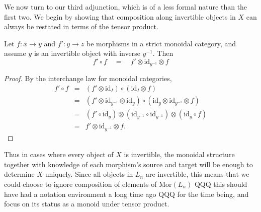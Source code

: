 \documentclass{amsbook} %
\newcommand{\mb}{\mathbf}
\newcommand{\mon}{\ensuremath{\mb{Mon}}}
\numberwithin{section}{chapter}
\begin{document}
We now turn to our third adjunction, which is of a less formal nature than the first two. We begin by showing that composition along invertible objects in $X$ can always be restated in terms of the tensor product.

\begin{lem} \label{tenscomp} Let $f: x \to y$ and $f': y \to z$ be morphisms in a strict monoidal category, and assume $y$ is an invertible object with inverse $y^{-1}$. Then
\[ f' \circ f \quad = \quad f' \otimes \mathrm{id}_{y^{-1}} \otimes f \]
\end{lem}
\begin{proof}
By the interchange law for monoidal categories,
\[\begin{array}{rll} 
			f' \circ f & = & (f' \otimes \mathrm{id}_I) \circ (\mathrm{id}_I \otimes f) \\
			& = & (f' \otimes \mathrm{id}_{y^{-1}} \otimes \mathrm{id}_y) \circ (\mathrm{id}_y \otimes \mathrm{id}_{y^{-1}} \otimes f) \\
			& = & (f' \circ \mathrm{id}_y) \otimes (\mathrm{id}_{y^{-1}} \circ \mathrm{id}_{y^{-1}}) \otimes (\mathrm{id}_y \circ f) \\
			& = & f' \otimes \mathrm{id}_{y^{-1}} \otimes f .
		\end{array}
\]
\end{proof} 

Thus in cases where every object of $X$ is invertible, the monoidal structure together with knowledge of each morphism's source and target will be enough to determine $X$ uniquely. Since all objects in $L_n$ are invertible, this means that we could choose to ignore composition of elements of $\mathrm{Mor}(L_n)$ QQQ this should have had a notation environment a long time ago QQQ for the time being, and focus on its status as a monoid under tensor product.

\end{document}
